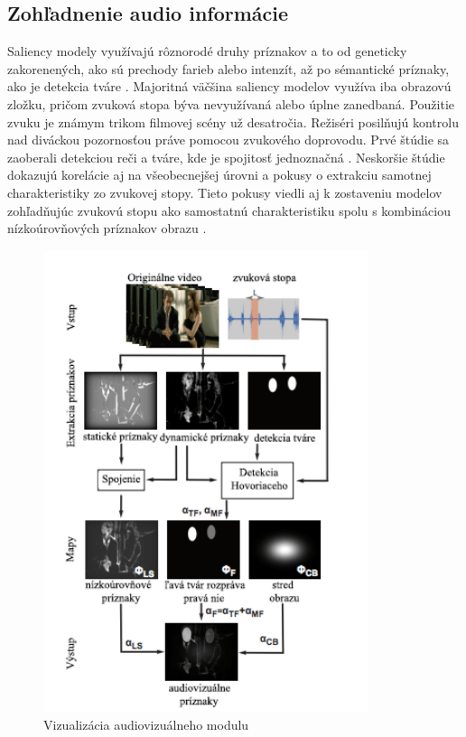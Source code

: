 \subsection{Zohľadnenie audio informácie}
Saliency modely využívajú rôznorodé druhy príznakov a to od geneticky zakorenených, ako sú prechody farieb alebo intenzít, až po sémantické príznaky, ako je detekcia tváre \cite{salient-faces}.
Majoritná väčšina saliency modelov využíva iba obrazovú zložku, pričom zvuková stopa býva nevyužívaná alebo úplne zanedbaná.
Použitie zvuku je známym trikom filmovej scény už desatročia.
Režiséri posilňujú kontrolu nad diváckou pozornosťou práve pomocou zvukového doprovodu.
Prvé štúdie sa zaoberali detekciou reči a tváre, kde je spojitosť jednoznačná \cite{sound-1}.
Neskoršie štúdie dokazujú korelácie aj na všeobecnejšej úrovni a pokusy o extrakciu samotnej charakteristiky zo zvukovej stopy\cite{sound-coutrot-1}.
Tieto pokusy viedli aj k zostaveniu modelov zohľadňujúc zvukovú stopu ako samostatnú charakteristiku spolu s kombináciou nízkoúrovňových príznakov obrazu \cite{sound-courot-2}.

\begin{figure}[H]
  \centering
  \includegraphics[width=9.5cm]{pics/courot-1.png}
  \caption{Vizualizácia audiovizuálneho modulu\cite{sound-courot-2}}\label{wrap-fig:4}
\end{figure}
\vspace{10mm}

